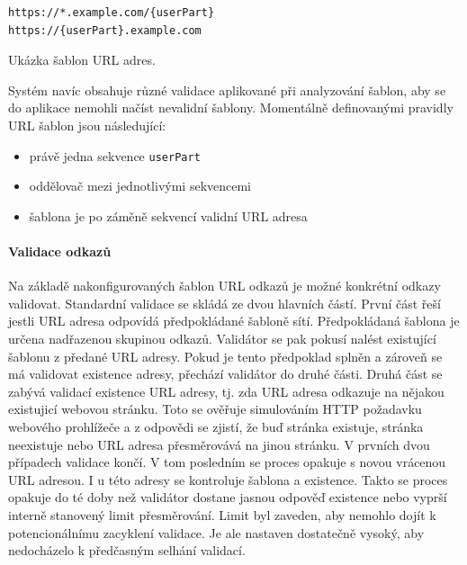 			\begin{lstlisting}
https://*.example.com/{userPart}
https://{userPart}.example.com
			\end{lstlisting}
			Ukázka šablon URL adres. %

			Systém navíc obsahuje různé validace aplikované při analyzování šablon, aby se do aplikace nemohli načíst
			nevalidní šablony.
			Momentálně definovanými pravidly URL šablon jsou následující:
			\begin{itemize}
				\item právě jedna sekvence \lstinline{userPart}
				\item oddělovač mezi jednotlivými sekvencemi
				\item šablona je po záměně sekvencí validní URL adresa
			\end{itemize}

			\paragraph{Validace odkazů}

			Na základě nakonfigurovaných šablon URL odkazů je možné konkrétní odkazy validovat.
			Standardní validace se skládá ze dvou hlavních částí.
			První část řeší jestli \ac{URL} adresa odpovídá předpokládané šabloně sítí.
			Předpokládaná šablona je určena nadřazenou skupinou odkazů.
			Validátor se pak pokusí nalést existující šablonu z předané URL adresy.
			Pokud je tento předpoklad splněn a zároveň se má validovat existence adresy, přechází validátor do druhé části.
			Druhá část se zabývá validací existence \ac{URL} adresy, tj. zda URL adresa odkazuje na nějakou existujicí
			webovou stránku.
			Toto se ověřuje simulováním \ac{HTTP} požadavku webového prohlížeče a z odpovědi se zjistí, že buď stránka
			existuje, stránka neexistuje nebo URL adresa přesměrovává na jinou stránku.
			V prvních dvou případech validace končí.
			V tom posledním se proces opakuje s novou vrácenou URL adresou.
			I u této adresy se kontroluje šablona a existence.
			Takto se proces opakuje do té doby než validátor dostane jasnou odpověď existence nebo vyprší interně stanovený
			limit přesměrování.
			Limit byl zaveden, aby nemohlo dojít k potencionálnímu zacyklení validace.
			Je ale nastaven dostatečně vysoký, aby nedocházelo k předčasným selhání validací.

